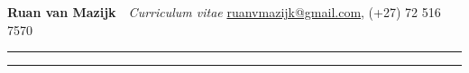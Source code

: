 {\huge \textbf{Ruan van Mazijk}}~~{\Large \textit{Curriculum vitae}}
              \hfill \href{mailto:ruanvmazijk@gmail.com}{ruanvmazijk@gmail.com},
                                                               (+27) 72 516 7570

\vskip10pt \hrule \vskip2pt \hrule

